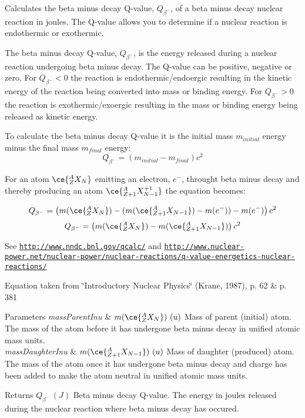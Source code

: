 Calculates the beta minus decay Q-\/value, $Q_{\beta^-}$, of a beta minus decay nuclear reaction in joules. The Q-\/value allows you to determine if a nuclear reaction is endothermic or exothermic. 

The beta minus decay Q-\/value, $Q_{\beta^-}$, is the energy released during a nuclear reaction undergoing beta minus decay. The Q-\/value can be positive, negative or zero. For $Q_{\beta^-} < 0$ the reaction is endothermic/endoergic resulting in the kinetic energy of the reaction being converted into mass or binding energy. For $Q_{\beta^-} > 0$ the reaction is exothermic/exoergic resulting in the mass or binding energy being released as kinetic energy.

To calculate the beta minus decay Q-\/value it is the initial mass $m_{initial}$ energy minus the final mass $m_{final}$ energy\+: \[Q_{\beta^-} = \left ( m_{initial}-m_{final}\right ) c^2\]

For an atom $\ce{ ^{A}_{Z}X_{N} }$ emitting an electron, $e^-$, throught beta minus decay and thereby producing an atom $\ce{ ^{A}_{Z{+1}}X^{+1}_{N-1} }$ the equation becomes\+:

\[Q_{\beta^-} = \left ( m(\ce{ ^{A}_{Z}X_{N} }) - (m(\ce{ ^{A}_{Z{+1}}X_{N-1} }) - m(e^-)) - m(e^-)\right ) c^2\] \[Q_{\beta^-} = \left ( m(\ce{ ^{A}_{Z}X_{N} }) - m(\ce{ ^{A}_{Z{+1}}X_{N-1} })\right ) c^2\]

See \href{http://www.nndc.bnl.gov/qcalc/}{\tt http\+://www.\+nndc.\+bnl.\+gov/qcalc/} and \href{http://www.nuclear-power.net/nuclear-power/nuclear-reactions/q-value-energetics-nuclear-reactions/}{\tt http\+://www.\+nuclear-\/power.\+net/nuclear-\/power/nuclear-\/reactions/q-\/value-\/energetics-\/nuclear-\/reactions/}

Equation taken from \char`\"{}\+Introductory Nuclear Physics\char`\"{} (Krane, 1987), p. 62 \& p. 381


\begin{DoxyParams}{Parameters}
{\em mass\+Parent\+Inu} & $m(\ce{ ^{A}_{Z}X_{N} })\ (u)$ Mass of parent (initial) atom. The mass of the atom before it has undergone beta minus decay in unified atomic mass units. \\
\hline
{\em mass\+Daughter\+Inu} & $m(\ce{ ^{A}_{Z{+1}}X_{N-1} })\ (u)$ Mass of daughter (produced) atom. The mass of the atom once it has undergone beta minus decay and charge has been added to make the atom neutral in unified atomic mass units. \\
\hline
\end{DoxyParams}
\begin{DoxyReturn}{Returns}
$Q_{\beta^-}\ (J)$ Beta minus decay Q-\/value. The energy in joules released during the nuclear reaction where beta minus decay has occured. 
\end{DoxyReturn}
\mbox{\label{group___q_value_ga42468e998cf58a027a676755aa1339ba}} 
